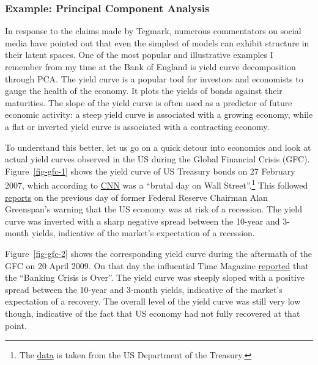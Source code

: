 \documentclass[
  letterpaper,
  DIV=11,
  numbers=noendperiod]{scrartcl}
\theoremstyle{plain}
\theoremstyle{remark}
\begin{document}
\subsubsection{Example: Principal Component
Analysis}\label{example-principal-component-analysis}

In response to the claims made by Tegmark, numerous commentators on
social media have pointed out that even the simplest of models can
exhibit structure in their latent spaces. One of the most popular and
illustrative examples I remember from my time at the Bank of England is
yield curve decomposition through PCA. The yield curve is a popular tool
for investors and economists to gauge the health of the economy. It
plots the yields of bonds against their maturities. The slope of the
yield curve is often used as a predictor of future economic activity: a
steep yield curve is associated with a growing economy, while a flat or
inverted yield curve is associated with a contracting economy.

To understand this better, let us go on a quick detour into economics
and look at actual yield curves observed in the US during the Global
Financial Crisis (GFC). Figure~\ref{fig-gfc-1} shows the yield curve of
US Treasury bonds on 27 February 2007, which according to
\href{https://money.cnn.com/2007/02/27/markets/markets_0630/index.htm?cnn=yes}{CNN}
was a ``brutal day on Wall Street''.\footnote{The
  \href{https://home.treasury.gov/resource-center/data-chart-center/interest-rates/TextView?type=daily_treasury_yield_curve&field_tdr_date_value_month=202310}{data}
  is taken from the US Department of the Treasury.} This followed
\href{https://money.cnn.com/2007/02/26/news/economy/greenspan/index.htm?postversion=2007022609}{reports}
on the previous day of former Federal Reserve Chairman Alan Greenspan's
warning that the US economy was at risk of a recession. The yield curve
was inverted with a sharp negative spread between the 10-year and
3-month yields, indicative of the market's expectation of a recession.

Figure~\ref{fig-gfc-2} shows the corresponding yield curve during the
aftermath of the GFC on 20 April 2009. On that day the influential Time
Magazine
\href{https://content.time.com/time/business/article/0,8599,1890560,00.html}{reported}
that the ``Banking Crisis is Over''. The yield curve was steeply sloped
with a positive spread between the 10-year and 3-month yields,
indicative of the market's expectation of a recovery. The overall level
of the yield curve was still very low though, indicative of the fact
that US economy had not fully recovered at that point.
\end{document}
